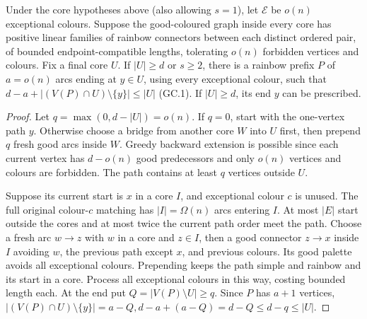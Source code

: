 \begin{lemma}\label{gcp:prefix}
Under the core hypotheses above (also allowing $s=1$), let $\mathcal{E}$ be $o(n)$ exceptional colours. Suppose the good-coloured graph inside every core has positive linear families of rainbow connectors between each distinct ordered pair, of bounded endpoint-compatible lengths, tolerating $o(n)$ forbidden vertices and colours. Fix a final core $U$. If $|U|\ge{}d$ or $s\ge2$, there is a rainbow prefix $P$ of $a=o(n)$ arcs ending at $y\in{}U$, using every exceptional colour, such that $d-a+|(V(P)\cap{}U)\setminus\{y\}|\le|U|$ \textup{(GC.1)}. If $|U|\ge{}d$, its end $y$ can be prescribed.
\end{lemma}
\begin{proof}
Let $q=\max(0,d-|U|)=o(n)$. If $q=0$, start with the one-vertex path $y$. Otherwise choose a bridge from another core $W$ into $U$ first, then prepend $q$ fresh good arcs inside $W$. Greedy backward extension is possible since each current vertex has $d-o(n)$ good predecessors and only $o(n)$ vertices and colours are forbidden. The path contains at least $q$ vertices outside $U$.

Suppose its current start is $x$ in a core $I$, and exceptional colour $c$ is unused. The full original colour-$c$ matching has $|I|=\Omega(n)$ arcs entering $I$. At most $|E|$ start outside the cores and at most twice the current path order meet the path. Choose a fresh arc $w\to{}z$ with $w$ in a core and $z\in{}I$, then a good connector $z\to{}x$ inside $I$ avoiding $w$, the previous path except $x$, and previous colours. Its good palette avoids all exceptional colours. Prepending keeps the path simple and rainbow and its start in a core. Process all exceptional colours in this way, costing bounded length each. At the end put $Q=|V(P)\setminus{}U|\ge{}q$. Since $P$ has $a+1$ vertices, $|(V(P)\cap{}U)\setminus\{y\}|=a-Q,d-a+(a-Q)=d-Q\le{}d-q\le|U|$.
\end{proof}

